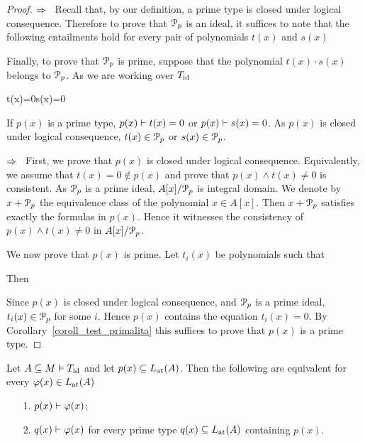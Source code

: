 \begin{proof}
  $\IMP$ \ Recall that, by our definition, a prime type is closed under logical consequence. 
  Therefore to prove that $\P_p$ is an ideal, it suffices to note that the following entailments hold for every pair of polynomials $t(x)$ and $s(x)$



  Finally, to prove that $\P_p$ is prime, suppose that the polynomial $t(x)\cdot s(x)$ belongs to $\P_p$.
  As we are working over $T_{\rm id}$
  
  {\proves}
  {t(x)=0\vee s(x)=0}
  
  If $p(x)$ is a prime type, $p(x)\proves t(x)=0$ or $p(x)\proves s(x)=0$.
  As $p(x)$ is closed under logical consequence, $t(x)\in\P_p$ or $s(x)\in\P_p$.

  $\IMP$ \ First, we prove that $p(x)$ is closed under logical consequence.
  Equivalently, we assume that $t(x)=0\notin p(x)$ and prove that $p(x)\wedge t(x)\neq0$ is consistent.
  As $\P_p$ is a prime ideal, $A[x]/\P_p$ is integral domain.
  We denote by $x+\P_p$ the equivalence class of the polynomial $x\in A[x]$.
  Then  $x+\P_p$ satisfies exactly the formulas in $p(x)$. 
  Hence it witnesses the consistency of $p(x)\wedge t(x)\neq0$ in $A[x]/\P_p$.

  We now prove that $p(x)$ is prime.
  Let $t_i(x)$ be polynomials such that


  Then


  Since $p(x)$ is closed under logical consequence, and $\P_p$ is a prime ideal, $t_i(x)\in\P_p$ for some $i$.
  Hence $p(x)$ contains the equation $t_i(x)=0$.
  By Corollary~\ref{coroll_test_primalita} this suffices to prove that $p(x)$ is a prime type.
\end{proof}

\begin{proposition}\label{prop_chiusura-radicale}
  Let $A\subseteq M\models T_{\rm id}$ and let $p(x)\subseteq\atL(A)$. 
  Then the following are equivalent for every $\phi(x)\in\atL(A)$
  \begin{itemize}
    \item[1.] $p(x)\proves\phi(x)$;
    \item[2.] $q(x)\proves\phi(x)$ for every prime type $q(x)\subseteq\atL(A)$ containing $p(x)$.
  \end{itemize} 
\end{proposition}

